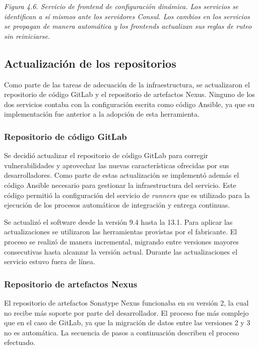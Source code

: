 \textit{Figura 4.6. Servicio de frontend de configuración dinámica. Los servicios se identifican a sí mismos ante los servidores Consul. Los cambios en los servicios se propagan de manera automática y los frontends actualizan sus reglas de ruteo sin reiniciarse.}

\subsection{Actualización de los repositorios}

Como parte de las tareas de adecuación de la infraestructura, se actualizaron el repositorio de código GitLab y el repositorio de artefactos Nexus. Ninguno de los dos servicios contaba con la configuración escrita como código Ansible, ya que su implementación fue anterior a la adopción de esta herramienta.

\subsubsection{Repositorio de código GitLab}

Se decidió actualizar el repositorio de código GitLab para corregir vulnerabilidades y aprovechar las nuevas características ofrecidas por sus desarrolladores. Como parte de estas actualización se implementó además el código Ansible necesario para gestionar la infraestructura del servicio. Este código permitió la configuración del servicio de \textit{runners} que es utilizado para la ejecución de los procesos automáticos de integración y entrega continuas.

Se actualizó el software desde la versión 9.4 hasta la 13.1. Para aplicar las actualizaciones se utilizaron las herramientas provistas por el fabricante. El proceso se realizó de manera incremental, migrando entre versiones mayores consecutivas hasta alcanzar la versión actual. Durante las actualizaciones el servicio estuvo fuera de línea.

\subsubsection{Repositorio de artefactos Nexus}

El repositorio de artefactos Sonatype Nexus funcionaba en su versión 2, la cual no recibe más soporte por parte del desarrollador. El proceso fue más complejo que en el caso de GitLab, ya que la migración de datos entre las versiones 2 y 3 no es automática. La secuencia de pasos a continuación describen el proceso efectuado.

